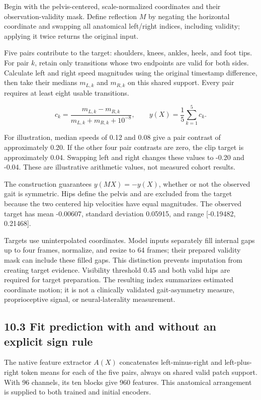 \documentclass[11pt,letterpaper]{article}
\begin{document}
Begin with the pelvis-centered, scale-normalized coordinates and their
observation-validity mask. Define reflection \(M\) by negating the
horizontal coordinate and swapping all anatomical left/right indices,
including validity; applying it twice returns the original input.

Five pairs contribute to the target: shoulders, knees, ankles, heels,
and foot tips. For pair \(k\), retain only transitions whose two
endpoints are valid for both sides. Calculate left and right speed
magnitudes using the original timestamp difference, then take their
medians \(m_{L,k}\) and \(m_{R,k}\) on this shared support. Every pair
requires at least eight usable transitions.

\[
c_k=\frac{m_{L,k}-m_{R,k}}{m_{L,k}+m_{R,k}+10^{-8}},
\qquad
y(X)=\frac{1}{5}\sum_{k=1}^{5}c_k.
\]

For illustration, median speeds of 0.12 and 0.08 give a pair contrast of
approximately 0.20. If the other four pair contrasts are zero, the clip
target is approximately 0.04. Swapping left and right changes these
values to -0.20 and -0.04. These are illustrative arithmetic values, not
measured cohort results.

The construction guarantees \(y(MX)=-y(X)\), whether or not the observed
gait is symmetric. Hips define the pelvis and are excluded from the
target because the two centered hip velocities have equal magnitudes.
The observed target has mean -0.00607, standard deviation 0.05915, and
range {[}-0.19482, 0.21468{]}.

Targets use uninterpolated coordinates. Model inputs separately fill
internal gaps up to four frames, normalize, and resize to 64 frames;
their prepared validity mask can include these filled gaps. This
distinction prevents imputation from creating target evidence.
Visibility threshold 0.45 and both valid hips are required for target
preparation. The resulting index summarizes estimated coordinate motion;
it is not a clinically validated gait-asymmetry measure, proprioceptive
signal, or neural-laterality measurement.

\subsection{10.3 Fit prediction with and without an explicit sign
rule}\label{fit-prediction-with-and-without-an-explicit-sign-rule}

The native feature extractor \(A(X)\) concatenates left-minus-right and
left-plus-right token means for each of the five pairs, always on shared
valid patch support. With 96 channels, its ten blocks give 960 features.
This anatomical arrangement is supplied to both trained and initial
encoders.
\end{document}
